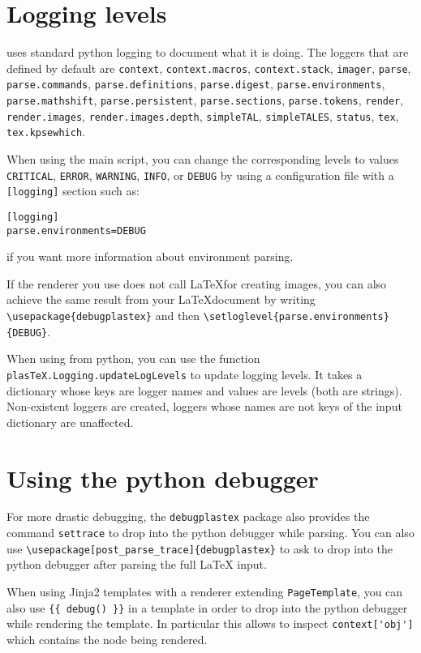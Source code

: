 \section{Logging levels}
\label{sec:logging-levels}

\plasTeX uses standard python logging to document what it is doing. The
loggers that are defined by default are
\verb+context+,
\verb+context.macros+,
\verb+context.stack+,
\verb+imager+,
\verb+parse+,
\verb+parse.commands+,
\verb+parse.definitions+,
\verb+parse.digest+,
\verb+parse.environments+,
\verb+parse.mathshift+,
\verb+parse.persistent+,
\verb+parse.sections+,
\verb+parse.tokens+,
\verb+render+,
\verb+render.images+,
\verb+render.images.depth+,
\verb+simpleTAL+,
\verb+simpleTALES+,
\verb+status+,
\verb+tex+,
\verb+tex.kpsewhich+.

When using the main  script, you can change the
corresponding levels to values \verb+CRITICAL+, \verb+ERROR+,
\verb+WARNING+, \verb+INFO+, or \verb+DEBUG+ by using a configuration
file with a \verb+[logging]+ section such as:
\begin{verbatim}
[logging]
parse.environments=DEBUG
\end{verbatim}
if you want more information about environment parsing.

If the renderer you use does not call \LaTeX for creating images, you
can also achieve the same result from your \LaTeX document
by writing \verb+\usepackage{debugplastex}+ and then
\verb+\setloglevel{parse.environments}{DEBUG}+.

When using \plasTeX from python, you can use the function
\verb+plasTeX.Logging.updateLogLevels+ to update logging levels. It takes
a dictionary whose keys are logger names and values are levels (both are
strings). Non-existent loggers are created, loggers whose names are not
keys of the input dictionary are unaffected.


\section{Using the python debugger}

For more drastic debugging, the \verb+debugplastex+ package also
provides the command \verb+settrace+ to drop into the python debugger
while parsing. You can also use
\verb+\usepackage[post_parse_trace]{debugplastex}+ to ask \plasTeX
to drop into the python debugger after parsing the full LaTeX input.

When using Jinja2 templates with a renderer extending
\verb+PageTemplate+, you can also use \verb+{{ debug() }}+ in a template in
order to drop into the python debugger while rendering the template. In
particular this allows to inspect \verb+context['obj']+ which contains
the node being rendered.
